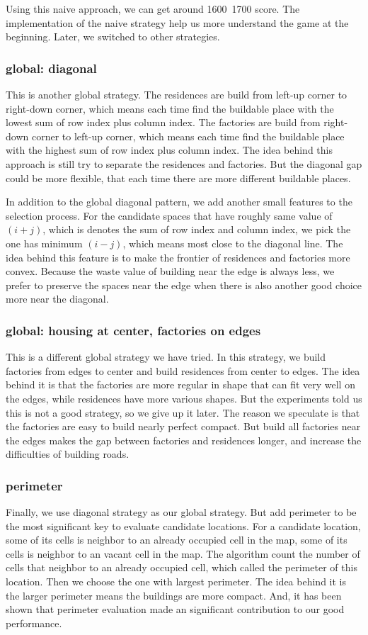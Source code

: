 Using this naive approach, we can get around 1600~1700 score. The implementation of the naive strategy help us more understand the game at the beginning. Later, we switched to other strategies.
\subsubsection{global: diagonal}
This is another global strategy. The residences are build from left-up corner to right-down corner, which means each time find the buildable place with the lowest sum of row index plus column index. The factories are build from right-down corner to left-up corner, which means each time find the buildable place with the highest sum of row index plus column index. The idea behind this approach is still try to separate the residences and factories. But the diagonal gap could be more flexible, that each time there are more different buildable places.

In addition to the global diagonal pattern, we add another small features to the selection process. For the candidate spaces that have roughly same value of $(i+j)$, which is denotes the sum of row index and column index, we pick the one has minimum $(i-j)$, which means most close to the diagonal line. The idea behind this feature is to make the frontier of residences and factories more convex. Because the waste value of building near the edge is always less, we prefer to preserve the spaces near the edge when there is also another good choice more near the diagonal.
\subsubsection{global: housing at center, factories on edges}
This is a different global strategy we have tried. In this strategy, we build factories from edges to center and build residences from center to edges. The idea behind it is that the factories are more regular in shape that can fit very well on the edges, while residences have more various shapes. But the experiments told us this is not a good strategy, so we give up it later. The reason we speculate is that the factories are easy to build nearly perfect compact. But build all factories near the edges makes the gap between factories and residences longer, and increase the difficulties of building roads.
\subsubsection{perimeter}
Finally, we use diagonal strategy as our global strategy. But add perimeter to be the most significant key to evaluate candidate locations. For a candidate location, some of its cells is neighbor to an already occupied cell in the map, some of its cells is neighbor to an vacant cell in the map. The algorithm count the number of cells that neighbor to an already occupied cell, which called the perimeter of this location. Then we choose the one with largest perimeter. The idea behind it is the larger perimeter means the buildings are more compact. And, it has been shown that perimeter evaluation made an significant contribution to our good performance.

